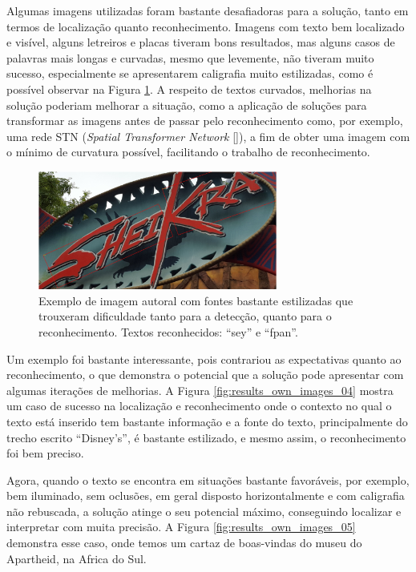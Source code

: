 Algumas imagens utilizadas foram bastante desafiadoras para a solução, tanto em termos de localização quanto reconhecimento. Imagens com texto bem localizado e visível, alguns letreiros e placas tiveram bons resultados, mas alguns casos de palavras mais longas e curvadas, mesmo que levemente, não tiveram muito sucesso, especialmente se apresentarem caligrafia muito estilizadas, como é possível observar na Figura \ref{fig:results_own_images_03}. A respeito de textos curvados, melhorias na solução poderiam melhorar a situação, como a aplicação de soluções para transformar as imagens antes de passar pelo reconhecimento como, por exemplo, uma rede STN (\textit{Spatial Transformer Network} []), a fim de obter uma imagem com o mínimo de curvatura possível, facilitando o trabalho de reconhecimento.

\begin{figure}
    \centering
    \includegraphics[width=0.7\textwidth]{figs/resultados-autoral-03.png}
    \caption{Exemplo de imagem autoral com fontes bastante estilizadas que trouxeram dificuldade tanto para a detecção, quanto para o reconhecimento. Textos reconhecidos: “sey” e “fpan”.}
    \label{fig:results_own_images_03}
\end{figure}


Um exemplo foi bastante interessante, pois contrariou as expectativas quanto ao reconhecimento, o que demonstra o potencial que a solução pode apresentar com algumas iterações de melhorias. A Figura \ref{fig:results_own_images_04} mostra um caso de sucesso na localização e reconhecimento onde o contexto no qual o texto está inserido tem bastante informação e a fonte do texto, principalmente do trecho escrito “Disney’s”, é bastante estilizado, e mesmo assim, o reconhecimento foi bem preciso.


Agora, quando o texto se encontra em situações bastante favoráveis, por exemplo, bem iluminado, sem oclusões, em geral disposto horizontalmente e com caligrafia não rebuscada, a solução atinge o seu potencial máximo, conseguindo localizar e interpretar com muita precisão. A Figura \ref{fig:results_own_images_05} demonstra esse caso, onde temos um cartaz de boas-vindas do museu do Apartheid, na Africa do Sul.

